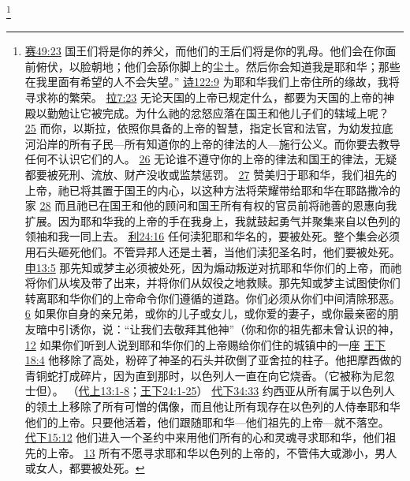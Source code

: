 \documentclass[12pt, a4paper, oneside]{ctexart}
\begin{document}
	\footnote {
		\href{https://biblehub.com/isaiah/49-23.htm}{赛49:23} 国王们将是你的养父，而他们的王后们将是你的乳母。他们会在你面前俯伏，以脸朝地；他们会舔你脚上的尘土。然后你会知道我是耶和华；那些在我里面有希望的人不会失望。”
		\href{https://biblehub.com/psalms/122-9.htm}{诗122:9} 为耶和华我们上帝住所的缘故，我将寻求祢的繁荣。
		\href{https://biblehub.com/ezra/7-23.htm}{拉7:23} 无论天国的上帝已规定什么，都要为天国的上帝的神殿以勤勉让它被完成。为什么祂的忿怒应落在国王和他儿子们的辖域上呢？
		\href{https://biblehub.com/ezra/7-25.htm}{25} 而你，以斯拉，依照你具备的上帝的智慧，指定长官和法官，为幼发拉底河沿岸的所有子民---所有知道你的上帝的律法的人---施行公义。而你要去教导任何不认识它们的人。
		\href{https://biblehub.com/ezra/7-26.htm}{26} 无论谁不遵守你的上帝的律法和国王的律法，无疑都要被死刑、流放、财产没收或监禁惩罚。
		\href{https://biblehub.com/ezra/7-27.htm}{27} 赞美归于耶和华，我们祖先的上帝，祂已将其置于国王的内心，以这种方法将荣耀带给耶和华在耶路撒冷的家
		\href{https://biblehub.com/ezra/7-28.htm}{28} 而且祂已在国王和他的顾问和国王所有有权的官员前将祂善的恩惠向我扩展。因为耶和华我的上帝的手在我身上，我就鼓起勇气并聚集来自以色列的领袖和我一同上去。
		\href{https://biblehub.com/leviticus/24-16.htm}{利24:16} 任何渎犯耶和华名的，要被处死。整个集会必须用石头砸死他们。不管异邦人还是土著，当他们渎犯圣名时，他们要被处死。
		\href{https://biblehub.com/deuteronomy/13-5.htm}{申13:5} 那先知或梦主必须被处死，因为煽动叛逆对抗耶和华你们的上帝，而祂将你们从埃及带了出来，并将你们从奴役之地救赎。那先知或梦主试图使你们转离耶和华你们的上帝命令你们遵循的道路。你们必须从你们中间清除邪恶。
		\href{https://biblehub.com/deuteronomy/13-6.htm}{6} 如果你自身的亲兄弟，或你的儿子或女儿，或你爱的妻子，或你最亲密的朋友暗中引诱你，说：“让我们去敬拜其他神”（你和你的祖先都未曾认识的神，
		\href{https://biblehub.com/deuteronomy/13-12.htm}{12} 如果你们听到人说到耶和华你们的上帝赐给你们住的城镇中的一座
		\href{https://biblehub.com/2_kings/18-4.htm}{王下18:4} 他移除了高处，粉碎了神圣的石头并砍倒了亚舍拉的柱子。他把摩西做的青铜蛇打成碎片，因为直到那时，以色列人一直在向它烧香。（它被称为尼忽士但）。
		（\href{https://biblehub.com/niv/1_chronicles/13.htm}{代上13:1-8}；\href{https://biblehub.com/niv/2_kings/24.htm}{王下24:1-25}） 
		\href{https://biblehub.com/2_chronicles/34-33.htm}{代下34:33} 约西亚从所有属于以色列人的领土上移除了所有可憎的偶像，而且他让所有现存在以色列的人侍奉耶和华他们的上帝。只要他活着，他们跟随耶和华---他们祖先的上帝---就不落空。
		\href{https://biblehub.com/2_chronicles/15-12.htm}{代下15:12} 他们进入一个圣约中来用他们所有的心和灵魂寻求耶和华，他们祖先的上帝。
		\href{https://biblehub.com/2_chronicles/15-13.htm}{13} 所有不愿寻求耶和华以色列的上帝的，不管伟大或渺小，男人或女人，都要被处死。
	}
\end{document}
